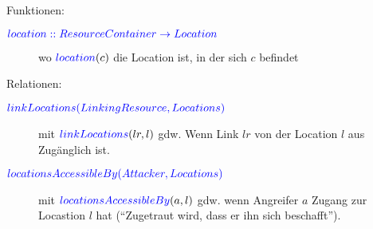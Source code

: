 Funktionen:
\begin{description}
  \item[${\color{blue}{location :: ResourceContainer \rightarrow Location}}$]
        wo ${\color{blue}{location}}(c)$ die Location ist, in der sich $c$ befindet
\end{description}


Relationen:
\begin{description}
  \item[${\color{blue}{linkLocations(LinkingResource, Locations)}}$]
        mit ${\color{blue}{linkLocations}}(lr, l)$ gdw. Wenn Link $lr$
        von der Location $l$ aus Zugänglich ist.

  \item[${\color{blue}{locationsAccessibleBy(Attacker, Locations)}}$]
        mit ${\color{blue}{locationsAccessibleBy}}(a, l)$ gdw. wenn Angreifer $a$
        Zugang zur Locastion $l$ hat (\enquote{Zugetraut wird, dass er ihn sich beschafft}).
\end{description} 
